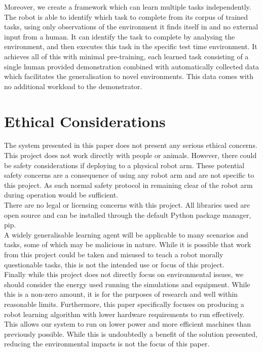 Moreover, we create a framework which can learn multiple tasks independently. The robot is able to identify which task to complete from its corpus of trained tasks, using only observations of the environment it finds itself in and no external input from a human. It can identify the task to complete by analysing the environment, and then executes this task in the specific test time environment. It achieves all of this with minimal pre-training, each learned task consisting of a single human provided demonstration combined with automatically collected data which facilitates the generalisation to novel environments. This data comes with no additional workload to the demonstrator.\\

\section{Ethical Considerations}
The system presented in this paper does not present any serious ethical concerns.\\

This project does not work directly with people or animals. However, there could be safety considerations if deploying to a physical robot arm. These potential safety concerns are a consequence of using any robot arm and are not specific to this project. As such normal safety protocol in remaining clear of the robot arm during operation would be sufficient.\\

There are no legal or licensing concerns with this project. All libraries used are open source and can be installed through the default Python package manager, pip.\\

A widely generalisable learning agent will be applicable to many scenarios and tasks, some of which may be malicious in nature. While it is possible that work from this project could be taken and misused to teach a robot morally questionable tasks, this is not the intended use or focus of this project.\\

Finally while this project does not directly focus on environmental issues, we should consider the energy used running the simulations and equipment. While this is a non-zero amount, it is for the purposes of research and well within reasonable limits. Furthermore, this paper specifically focuses on producing a robot learning algorithm with lower hardware requirements to run effectively. This allows our system to run on lower power and more efficient machines than previously possible. While this is undoubtedly a benefit of the solution presented, reducing the environmental impacts is not the focus of this paper.